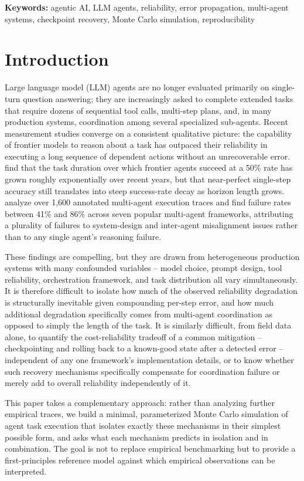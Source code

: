 \documentclass[11pt]{article}
\begin{document}
\noindent\textbf{Keywords:} agentic AI, LLM agents, reliability, error propagation, multi-agent systems, checkpoint recovery, Monte Carlo simulation, reproducibility

\tableofcontents

\section{Introduction}
Large language model (LLM) agents are no longer evaluated primarily on single-turn question answering; they are increasingly asked to complete extended tasks that require dozens of sequential tool calls, multi-step plans, and, in many production systems, coordination among several specialized sub-agents. Recent measurement studies converge on a consistent qualitative picture: the capability of frontier models to reason about a task has outpaced their reliability in executing a long sequence of dependent actions without an unrecoverable error. \citet{kwa2025measuring} find that the task duration over which frontier agents succeed at a 50\% rate has grown roughly exponentially over recent years, but that near-perfect single-step accuracy still translates into steep success-rate decay as horizon length grows. \citet{cemri2025why} analyze over 1,600 annotated multi-agent execution traces and find failure rates between 41\% and 86\% across seven popular multi-agent frameworks, attributing a plurality of failures to system-design and inter-agent misalignment issues rather than to any single agent's reasoning failure.

These findings are compelling, but they are drawn from heterogeneous production systems with many confounded variables -- model choice, prompt design, tool reliability, orchestration framework, and task distribution all vary simultaneously. It is therefore difficult to isolate how much of the observed reliability degradation is structurally inevitable given compounding per-step error, and how much additional degradation specifically comes from multi-agent coordination as opposed to simply the length of the task. It is similarly difficult, from field data alone, to quantify the cost-reliability tradeoff of a common mitigation -- checkpointing and rolling back to a known-good state after a detected error -- independent of any one framework's implementation details, or to know whether such recovery mechanisms specifically compensate for coordination failure or merely add to overall reliability independently of it.

This paper takes a complementary approach: rather than analyzing further empirical traces, we build a minimal, parameterized Monte Carlo simulation of agent task execution that isolates exactly these mechanisms in their simplest possible form, and asks what each mechanism predicts in isolation and in combination. The goal is not to replace empirical benchmarking but to provide a first-principles reference model against which empirical observations can be interpreted.
\end{document}
